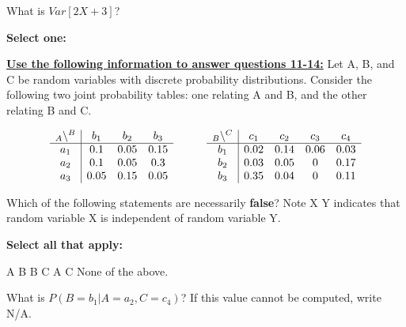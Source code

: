 \documentclass[11pt,addpoints,answers]{exam}
\numberwithin{equation}{section} %
\numberwithin{figure}{section} %
\numberwithin{table}{section} %
\begin{document}
\begin{questions}
    \question[1] What is $Var[2X + 3]$?

    \textbf{Select one:}
    \begin{checkboxes}
    \end{checkboxes}

    \clearpage
    \textbf{\underline{Use the following information to answer questions 11-14:}}
    Let A, B, and C be random variables with discrete probability distributions. Consider the following two joint probability tables: one relating A and B, and the other relating B and C.
    
    $$\begin{array}{c|ccc}
    _{\large A}\backslash^{\large B} & b_1 & b_2 & b_3 \\
    \hline
    a_1 & 0.1 & 0.05 & 0.15 \\
    a_2 & 0.1 & 0.05 & 0.3 \\
    a_3 & 0.05 & 0.15 & 0.05 \\
    \end{array}
    \quad \quad \quad
    \begin{array}{c|cccc}
    _{\large B}\backslash^{\large C} & c_1 & c_2 & c_3 & c_4 \\
    \hline
    b_1 & 0.02 & 0.14 & 0.06 & 0.03 \\
    b_2 & 0.03 & 0.05 & 0 & 0.17 \\
    b_3 & 0.35 & 0.04 & 0 & 0.11 \\
    \end{array}$$

    \question[1] Which of the following statements are necessarily \textbf{false}?  Note X  Y indicates that random variable X is independent of random variable Y.
    
    \textbf{Select all that apply:}
    \begin{checkboxes}{%
    \checkboxchar{$\Box$} \checkedchar{$\blacksquare$}

        \choice A  B
        \choice B  C
        \choice A  C
        \choice None of the above.
    }
    
    \end{checkboxes}
    
    

    \question[2] What is $P(B=b_1 | A = a_2, C = c_4)$? If this value cannot be computed, write N/A.
    

\end{questions}
\end{document}
